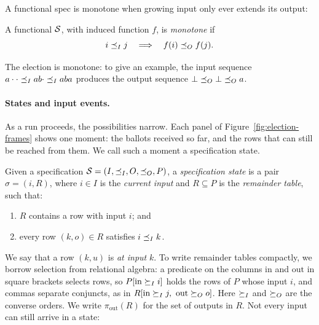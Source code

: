 A functional spec is monotone when growing input only
ever extends its output:


\begin{definition}
\label{def:functional-monotonicity}
A functional \spectype $\mathcal{S}$, with induced function $f$, is
\emph{monotone} if
\begin{equation}
  i\preceq_I j
  \quad\Longrightarrow\quad
  f(i)\preceq_O f(j).
  \label{eq:functional-monotonicity}
\end{equation}
\end{definition}

The election is monotone: to give an example, the input sequence
$a\cdot\cdot\preceq_I ab\cdot\preceq_I aba$ produces the output sequence
$\bot\preceq_O\bot\preceq_O a$.

\paragraph{States and input events.}
As a run proceeds, the possibilities narrow.  Each panel of
Figure~\ref{fig:election-frames} shows one moment: the ballots received so
far, and the rows that can still be reached from them.  We call such a moment
a specification state.

\begin{definition}
\label{def:residual-state}
Given a specification $\mathcal{S}=(I,\preceq_I,O,\preceq_O,P)$, a \emph{specification state} is a
pair $\sigma=(i,R)$, where $i\in I$ is the \emph{current input} and
$R\subseteq P$ is the \emph{remainder table}, such that:
\begin{enumerate}
  \item $R$ contains a row with input $i$; and
  \item every row $(k,o)\in R$ satisfies $i\preceq_I k$.
\end{enumerate}
\end{definition}

We say that a row $(k,u)$ is
\emph{at input} $k$.  To write remainder tables compactly, we borrow selection
from relational algebra: a predicate on the columns $\mathrm{in}$ and
$\mathrm{out}$ in square brackets selects rows, so $P[\mathrm{in}\succeq_I i]$
holds the rows of $P$ whose input \inrel $i$, and commas separate conjuncts, as
in $R[\mathrm{in}\succeq_I j,\ \mathrm{out}\succeq_O o]$.  Here $\succeq_I$ and
$\succeq_O$ are the converse orders.  We write $\pi_{\mathrm{out}}(R)$ for the
set of outputs in $R$.  Not every input can still arrive in a state:

